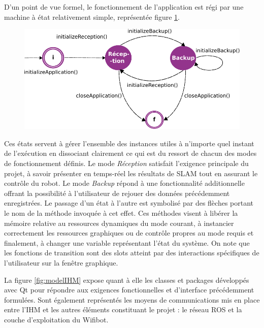 D'un point de vue formel, le fonctionnement de l'application est régi par une machine à état relativement simple, représentée figure \ref{fig:stateMachine}.

\begin{figure}[h]
  \centering
    \includegraphics[width=.6\linewidth]{figures/state_machine}  
  \label{fig:stateMachine}
\end{figure}

Ces états servent à gérer l'ensemble des instances utiles à n'importe quel instant de l'exécution en dissociant clairement ce qui est du ressort de chacun des modes de fonctionnement définis. 
Le mode \emph{Réception} satisfait l'exigence principale du projet, à savoir présenter en temps-réel les résultats de \gls{SLAM} tout en assurant le contrôle du robot. 
Le mode \emph{Backup} répond à une fonctionnalité additionnelle offrant la possibilité à l'utilisateur de rejouer des données précédemment enregistrées. 
Le passage d'un état à l'autre est symbolisé par des flèches portant le nom de la méthode invoquée à cet effet.
Ces méthodes visent à libérer la mémoire relative au ressources dynamiques du mode courant, à instancier correctement les ressources graphiques ou de contrôle propres au mode requis et finalement, à changer une variable représentant 
l'état du système. 
On note que les fonctions de transition sont des slots atteint par des interactions spécifiques de l'utilisateur sur la fenêtre graphique. 

La figure \ref{fig:modelIHM} expose quant à elle les classes et packages développés avec Qt pour répondre aux exigences fonctionnelles et d'interface précédemment formulées.   
Sont également représentés les moyens de communications mis en place entre l'IHM et les autres éléments constituant le projet : le réseau \gls{ROS} et la couche d'exploitation du Wifibot. 

